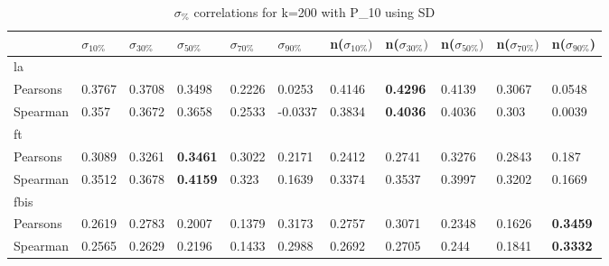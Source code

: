 \documentclass{sig-alternate}
\begin{document}
\begin{table}[h!]
\centering
\begin{tabular}{|l||l|l|l|l|l||l|l|l|l|l|}
\hline
& $\sigma_{10\%}$ & $\sigma_{30\%}$ & $\sigma_{50\%}$ & $\sigma_{70\%}$ & $\sigma_{90\%}$ & n($\sigma_{10\%})$ & n($\sigma_{30\%})$ & n($\sigma_{50\%})$ & n($\sigma_{70\%})$ & n($\sigma_{90\%}$) \\ \hline
\hline la &  &  &  &  &  &  &  &  &  &  \\ \hline
Pearsons & 0.3767 & 0.3708 & 0.3498 & 0.2226 & 0.0253 & 0.4146 & \textbf{0.4296} & 0.4139 & 0.3067 & 0.0548 \\ \hline
Spearman & 0.357 & 0.3672 & 0.3658 & 0.2533 & -0.0337 & 0.3834 & \textbf{0.4036} & 0.4036 & 0.303 & 0.0039 \\ \hline
\hline ft &  &  &  &  &  &  &  &  &  &  \\ \hline
Pearsons & 0.3089 & 0.3261 & \textbf{0.3461} & 0.3022 & 0.2171 & 0.2412 & 0.2741 & 0.3276 & 0.2843 & 0.187 \\ \hline
Spearman & 0.3512 & 0.3678 & \textbf{0.4159} & 0.323 & 0.1639 & 0.3374 & 0.3537 & 0.3997 & 0.3202 & 0.1669 \\ \hline
\hline fbis &  &  &  &  &  &  &  &  &  &  \\ \hline
Pearsons & 0.2619 & 0.2783 & 0.2007 & 0.1379 & 0.3173 & 0.2757 & 0.3071 & 0.2348 & 0.1626 & \textbf{0.3459} \\ \hline
Spearman & 0.2565 & 0.2629 & 0.2196 & 0.1433 & 0.2988 & 0.2692 & 0.2705 & 0.244 & 0.1841 & \textbf{0.3332} \\ \hline
\end{tabular}
\caption{$\sigma_{\%}$ correlations for k=200 with P\_10 using SD}
\end{table}
\end{document}

